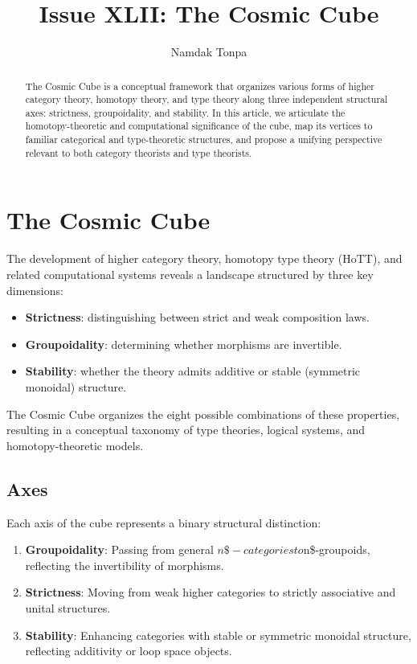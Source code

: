\documentclass{article}
\begin{document}
\title{Issue XLII: The Cosmic Cube}
\author{Namdak Tonpa}
\date{}

\maketitle

\begin{abstract}
The Cosmic Cube is a conceptual framework that organizes various forms of higher category theory, homotopy theory, and type theory along three independent structural axes: strictness, groupoidality, and stability. In this article, we articulate the homotopy-theoretic and computational significance of the cube, map its vertices to familiar categorical and type-theoretic structures, and propose a unifying perspective relevant to both category theorists and type theorists.
\end{abstract}

\ifincludeTOC
  \tableofcontents
\fi

\section{The Cosmic Cube}
The development of higher category theory, homotopy type theory (HoTT), and related computational systems reveals a landscape structured by three key dimensions:

\begin{itemize}
\item \textbf{Strictness}: distinguishing between strict and weak composition laws.
\item \textbf{Groupoidality}: determining whether morphisms are invertible.
\item \textbf{Stability}: whether the theory admits additive or stable (symmetric monoidal) structure.
\end{itemize}

The Cosmic Cube organizes the eight possible combinations of these properties, resulting in a conceptual taxonomy of type theories, logical systems, and homotopy-theoretic models.

\subsection{Axes}

Each axis of the cube represents a binary structural distinction:

\begin{enumerate}
\item \textbf{Groupoidality}: Passing from general $n\$-categories to $n\$-groupoids, reflecting the invertibility of morphisms.
\item \textbf{Strictness}: Moving from weak higher categories to strictly associative and unital structures.
\item \textbf{Stability}: Enhancing categories with stable or symmetric monoidal structure, reflecting additivity or loop space objects.
\end{enumerate}
\end{document}
